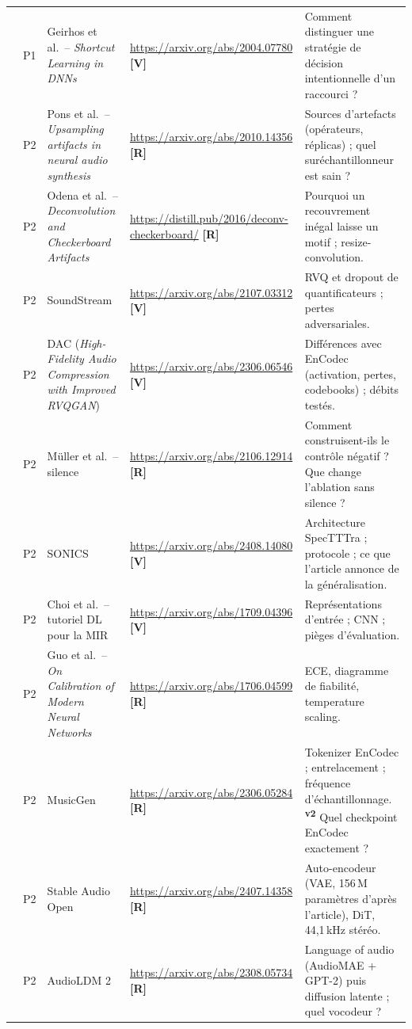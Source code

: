 \documentclass[11pt,a4paper]{article}
\providecommand{\og}{\guillemotleft\nobreakspace}%
\providecommand{\fg}{\nobreakspace\guillemotright}}
\newcommand{\vtwo}{\textsuperscript{\textcolor{orange!80!black}{\textbf{v2}}}}
\newcommand{\lV}{\textbf{\textcolor{green!45!black}{[V]}}}
\newcommand{\lR}{\textbf{\textcolor{orange!80!black}{[R]}}}
\begin{document}
{\begin{longtable}{L{0.6cm}L{0.9cm}L{3.9cm}L{4.5cm}L{5.0cm}}
 & P1 & Geirhos et al.\ -- \emph{Shortcut Learning in DNNs} & \url{https://arxiv.org/abs/2004.07780} \lV & Comment distinguer une stratégie de décision intentionnelle d'un raccourci ?\\
 & P2 & Pons et al.\ -- \emph{Upsampling artifacts in neural audio synthesis} & \url{https://arxiv.org/abs/2010.14356} \lR & Sources d'artefacts (opérateurs, réplicas) ; quel suréchantillonneur est sain ?\\
 & P2 & Odena et al.\ -- \emph{Deconvolution and Checkerboard Artifacts} & \url{https://distill.pub/2016/deconv-checkerboard/} \lR & Pourquoi un recouvrement inégal laisse un motif ; resize-convolution.\\
 & P2 & SoundStream & \url{https://arxiv.org/abs/2107.03312} \lV & RVQ et dropout de quantificateurs ; pertes adversariales.\\
 & P2 & DAC (\emph{High-Fidelity Audio Compression with Improved RVQGAN}) & \url{https://arxiv.org/abs/2306.06546} \lV & Différences avec EnCodec (activation, pertes, codebooks) ; débits testés.\\
 & P2 & Müller et al.\ -- silence & \url{https://arxiv.org/abs/2106.12914} \lR & Comment construisent-ils le contrôle négatif ? Que change l'ablation \og{}sans silence\fg{} ?\\
 & P2 & SONICS & \url{https://arxiv.org/abs/2408.14080} \lV & Architecture SpecTTTra ; protocole ; ce que l'article annonce de la généralisation.\\
 & P2 & Choi et al.\ -- tutoriel DL pour la MIR & \url{https://arxiv.org/abs/1709.04396} \lV & Représentations d'entrée ; CNN ; pièges d'évaluation.\\
 & P2 & Guo et al.\ -- \emph{On Calibration of Modern Neural Networks} & \url{https://arxiv.org/abs/1706.04599} \lR & ECE, diagramme de fiabilité, temperature scaling.\\
 & P2 & MusicGen & \url{https://arxiv.org/abs/2306.05284} \lR & Tokenizer EnCodec ; entrelacement ; fréquence d'échantillonnage. \vtwo{} Quel checkpoint EnCodec exactement ?\\
 & P2 & Stable Audio Open & \url{https://arxiv.org/abs/2407.14358} \lR & Auto-encodeur (VAE, 156\,M paramètres d'après l'article), DiT, 44,1\,kHz stéréo.\\
 & P2 & AudioLDM 2 & \url{https://arxiv.org/abs/2308.05734} \lR & \og{}Language of audio\fg{} (AudioMAE + GPT-2) puis diffusion latente ; quel vocodeur ?\\

\end{longtable}}
\end{document}

